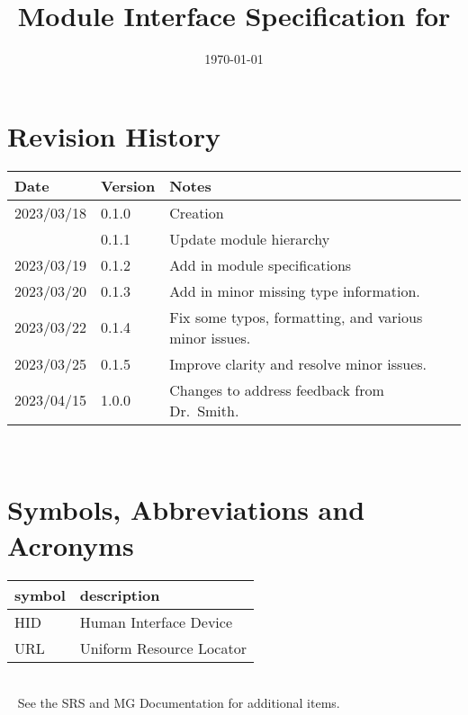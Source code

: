 \documentclass[12pt, titlepage]{article}
\begin{document}
\title{Module Interface Specification for \progname{}}

\author{\authname}

\date{\today}

\maketitle


\section{Revision History}

\begin{tabularx}{\textwidth}{p{3cm}p{2cm}X}
\toprule {\bf Date} & {\bf Version} & {\bf Notes}\\
\midrule
2023/03/18 & 0.1.0 & Creation\\
           & 0.1.1 & Update module hierarchy\\
2023/03/19 & 0.1.2 & Add in module specifications\\
2023/03/20 & 0.1.3 & Add in minor missing type information.\\
2023/03/22 & 0.1.4 & Fix some typos, formatting, and various minor issues.\\
2023/03/25 & 0.1.5 & Improve clarity and resolve minor issues.\\
2023/04/15 & 1.0.0 & Changes to address feedback from Dr.~Smith.\\
\bottomrule
\end{tabularx}

~\newpage

\section{Symbols, Abbreviations and Acronyms}

\renewcommand{\arraystretch}{1.2}
\begin{tabular}{l l} 
  \toprule		
  \textbf{symbol} & \textbf{description}\\
  \midrule 
  HID & Human Interface Device\\
  URL & Uniform Resource Locator\\
  \bottomrule
\end{tabular}\\

~\newline
\noindent See the SRS \cite{SRS} and MG \cite{MG} Documentation for additional items.
\end{document}
